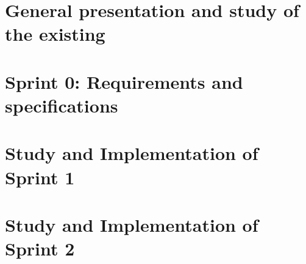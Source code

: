 \documentclass[pfe ,titlesmallcaps]{polypfe}
\begin{document}


%



\newpage


\tableofcontents

\newpage

\listoffigures

\newpage

\listoftables

\newpage



\newpage





\chapter{General presentation and study of the existing}
\clearpage







\chapter{Sprint 0: Requirements and specifications}
\clearpage






%


\chapter{Study and Implementation of Sprint 1}
\clearpage









\chapter{Study and Implementation of Sprint 2}
\clearpage
\end{document}
